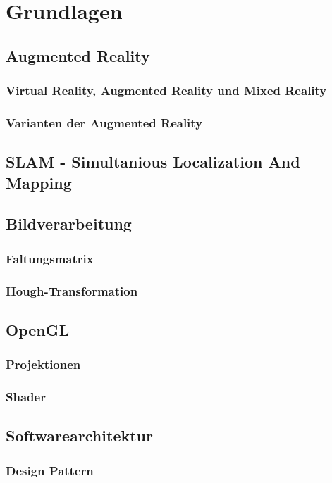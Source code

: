 
\chapter{Grundlagen}
\section{Augmented Reality}
\subsection{Virtual Reality, Augmented Reality und Mixed Reality}
\subsection{Varianten der Augmented Reality}

\section{SLAM - Simultanious Localization And Mapping}

\section{Bildverarbeitung}
\subsection{Faltungsmatrix}
\subsection{Hough-Transformation}

\section{OpenGL}
\subsection{Projektionen}
\subsection{Shader}

\section{Softwarearchitektur}
\subsection{Design Pattern}
